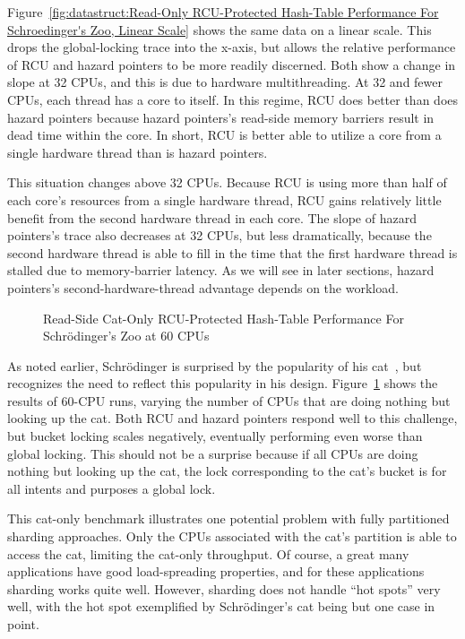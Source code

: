Figure~\ref{fig:datastruct:Read-Only RCU-Protected Hash-Table Performance For Schroedinger's Zoo, Linear Scale}
shows the same data on a linear scale.
This drops the global-locking trace into the x-axis, but allows the
relative performance of RCU and hazard pointers to be more readily
discerned.
Both show a change in slope at 32 CPUs, and this is due to hardware
multithreading.
At 32 and fewer CPUs, each thread has a core to itself.
In this regime, RCU does better than does hazard pointers because
hazard pointers's read-side memory barriers result in dead time within
the core.
In short, RCU is better able to utilize a core from a single hardware
thread than is hazard pointers.

This situation changes above 32 CPUs.
Because RCU is using more than half of each core's resources from a
single hardware thread, RCU gains relatively little benefit from the
second hardware thread in each core.
The slope of hazard pointers's trace also decreases at 32 CPUs, but
less dramatically,
because the second hardware thread is able to fill in the time
that the first hardware thread is stalled due to memory-barrier latency.
As we will see in later sections, hazard pointers's second-hardware-thread
advantage depends on the workload.

\begin{figure}[tb]
\centering
{}
\caption{Read-Side Cat-Only RCU-Protected Hash-Table Performance For Schr\"odinger's Zoo at 60 CPUs}
\label{fig:datastruct:Read-Side Cat-Only RCU-Protected Hash-Table Performance For Schroedinger's Zoo at 60 CPUs}
\end{figure}

As noted earlier, Schr\"odinger is surprised by the popularity of his
cat~\cite{ErwinSchroedinger1935Cat}, but recognizes the need to reflect
this popularity in his design.
Figure~\ref{fig:datastruct:Read-Side Cat-Only RCU-Protected Hash-Table Performance For Schroedinger's Zoo at 60 CPUs}
shows the results of 60-CPU runs, varying the number of CPUs that are
doing nothing but looking up the cat.
Both RCU and hazard pointers respond well to this challenge, but
bucket locking scales negatively, eventually performing even worse
than global locking.
This should not be a surprise because if all CPUs are doing nothing
but looking up the cat, the lock corresponding to the cat's bucket
is for all intents and purposes a global lock.

This cat-only benchmark illustrates one potential problem with
fully partitioned sharding approaches.
Only the CPUs associated with the cat's
partition is able to access the cat, limiting the cat-only
throughput.
Of course, a great many applications have good load-spreading
properties, and for these applications sharding works
quite well.
However, sharding does not handle ``hot spots'' very well, with
the hot spot exemplified by Schr\"odinger's cat being but one case
in point.

